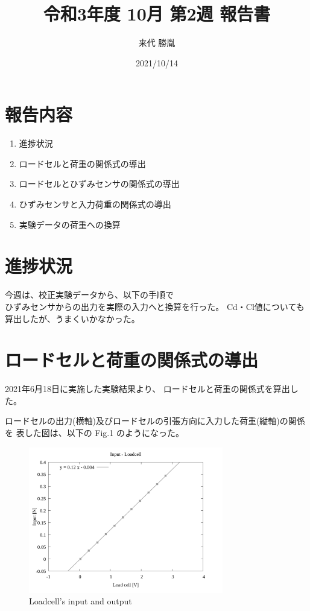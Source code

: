 \documentclass[twocolumn,a4j]{jsarticle}
\author{来代 勝胤}
\title{令和3年度 10月 第2週 報告書}
\date{2021/10/14}
\begin{document}
\columnseprule=0.1mm

\maketitle
\section*{報告内容}
\begin{enumerate}[1.]
    \item 進捗状況
    \item ロードセルと荷重の関係式の導出
    \item ロードセルとひずみセンサの関係式の導出
    \item ひずみセンサと入力荷重の関係式の導出
    \item 実験データの荷重への換算
\end{enumerate}
\section{進捗状況}
今週は、校正実験データから、以下の手順で\\
ひずみセンサからの出力を実際の入力へと換算を行った。
Cd・Cl値についても算出したが、うまくいかなかった。
\section{ロードセルと荷重の関係式の導出}
2021年6月18日に実施した実験結果より、
ロードセルと荷重の関係式を算出した。\par
ロードセルの出力(横軸)及びロードセルの引張方向に入力した荷重(縦軸)の関係を
表した図は、以下の Fig.1 のようになった。
\begin{figure}[htbp]
    \footnotesize
    \begin{center}
        \includegraphics[width=85mm]{../images/02_force&line.png}
        \caption{Loadcell's input and output}
    \end{center}
\end{figure}
\end{document}
